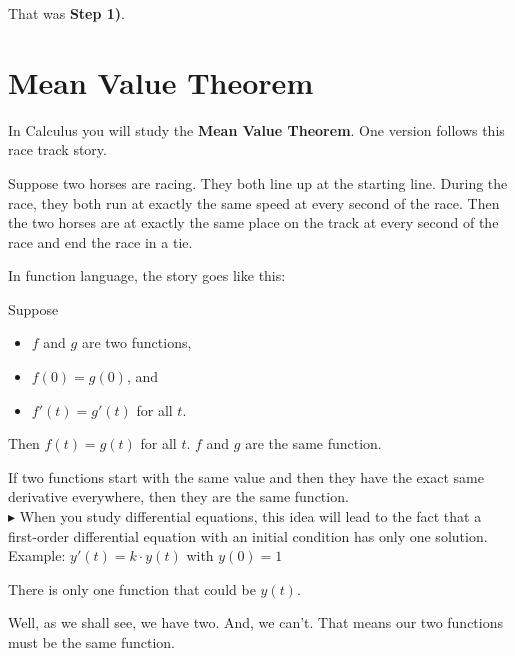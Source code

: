 \documentclass{ximera}
\begin{document}
That was \textbf{\textcolor{purple!85!blue}{Step 1)}}. \\





\section{Mean Value Theorem}



In Calculus you will study the \textbf{Mean Value Theorem}. One version follows this race track story.


Suppose two horses are racing.  They both line up at the starting line.  During the race, they both run at exactly the same speed at every second of the race.  Then the two horses are at exactly the same place on the track at every second of the race and end the race in a tie.




In function language, the story goes like this:

Suppose 

\begin{itemize}
\item $f$ and $g$ are two functions,
\item $f(0) = g(0)$, and
\item $f'(t) = g'(t)$  for all $t$.
\end{itemize}

Then $f(t)=g(t)$ for all $t$.   $f$ and $g$ are the same function.



If two functions start with the same value and then they have the exact same derivative everywhere, then they are the same function. \\









$\blacktriangleright$  When you study differential equations, this idea will lead to the fact that a first-order differential equation with an initial condition has only one solution. \\

Example: $y'(t) = k \cdot y(t)$ with $y(0)=1$


There is only one function that could be $y(t)$.

Well, as we shall see, we have two.  And, we can't.  That means our two functions must be the same function. \\
\end{document}
